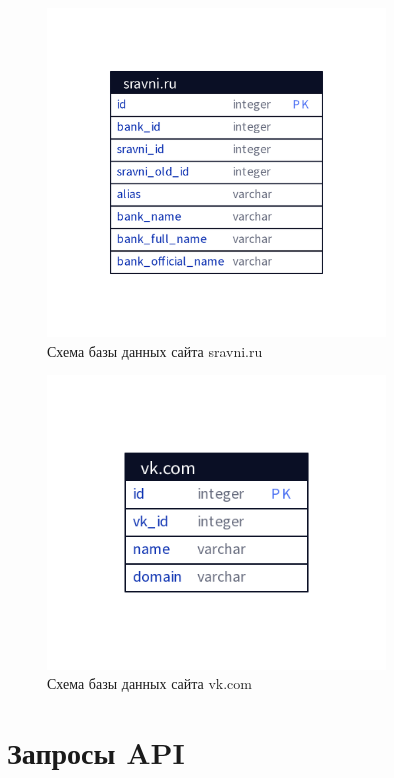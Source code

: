 \documentclass[PI, VKR]{HSEUniversity}
\begin{document}
\begin{figure}[h!]
\centering
\includegraphics[width=0.8\textwidth]{img/d2/sravni_ru.png}
\caption{\label{fig:database_sravni_ru}Схема базы данных сайта sravni.ru}
\end{figure}

\begin{figure}[h!]
\centering
\includegraphics[width=0.8\textwidth]{img/d2/vk_com.png}
\caption{\label{fig:database_vk_com}Схема базы данных сайта vk.com}
\end{figure}

\chapter{Запросы API}
\label{sec:org54fd70e}

\end{document}
